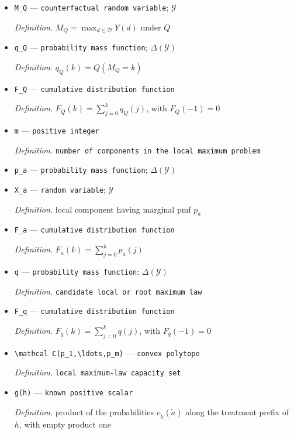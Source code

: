 \documentclass{article}
\begin{document}
\begin{itemize}
  \item \texttt{M\_\allowbreak{}Q} --- \texttt{counterfactual random variable}; \(\mathcal Y\)
  \par\smallskip\noindent\emph{Definition.} \(M_Q=\max_{d\in\mathcal D}Y(d)\) under \(Q\)
  \item \texttt{q\_\allowbreak{}Q} --- \texttt{probability mass function}; \(\Delta(\mathcal Y)\)
  \par\smallskip\noindent\emph{Definition.} \(q_Q(k)=Q(M_Q=k)\)
  \item \texttt{F\_\allowbreak{}Q} --- \texttt{cumulative distribution function}
  \par\smallskip\noindent\emph{Definition.} \(F_Q(k)=\sum_{j=0}^{k}q_Q(j)\), with \(F_Q(-1)=0\)
  \item \texttt{m} --- \texttt{positive integer}
  \par\smallskip\noindent\emph{Definition.} \texttt{number of components in the local maximum problem}
  \item \texttt{p\_\allowbreak{}a} --- \texttt{probability mass function}; \(\Delta(\mathcal Y)\)
  \item \texttt{X\_\allowbreak{}a} --- \texttt{random variable}; \(\mathcal Y\)
  \par\smallskip\noindent\emph{Definition.} local component having marginal pmf \(p_a\)
  \item \texttt{F\_\allowbreak{}a} --- \texttt{cumulative distribution function}
  \par\smallskip\noindent\emph{Definition.} \(F_a(k)=\sum_{j=0}^{k}p_a(j)\)
  \item \texttt{q} --- \texttt{probability mass function}; \(\Delta(\mathcal Y)\)
  \par\smallskip\noindent\emph{Definition.} \texttt{candidate local or root maximum law}
  \item \texttt{F\_\allowbreak{}q} --- \texttt{cumulative distribution function}
  \par\smallskip\noindent\emph{Definition.} \(F_q(k)=\sum_{j=0}^{k}q(j)\), with \(F_q(-1)=0\)
  \item \texttt{\textbackslash{}\allowbreak{}mathcal C(p\_\allowbreak{}1,\allowbreak{}\textbackslash{}\allowbreak{}ldots,\allowbreak{}p\_\allowbreak{}m)} --- \texttt{convex polytope}
  \par\smallskip\noindent\emph{Definition.} \texttt{local maximum-\allowbreak{}law capacity set}
  \item \texttt{g(h)} --- \texttt{known positive scalar}
  \par\smallskip\noindent\emph{Definition.} product of the probabilities \(e_{\tilde h}(\tilde a)\) along the treatment prefix of \(h\), with empty product one

\end{itemize}
\end{document}
